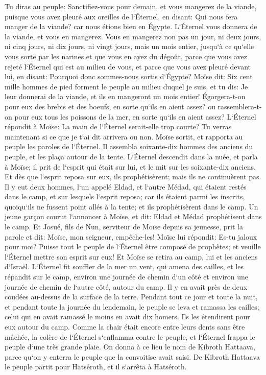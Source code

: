 \verse Tu diras au peuple: Sanctifiez-vous pour demain, et vous mangerez de la viande, puisque vous avez pleuré aux oreilles de l`Éternel, en disant: Qui nous fera manger de la viande? car nous étions bien en Égypte. L`Éternel vous donnera de la viande, et vous en mangerez. 
\verse Vous en mangerez non pas un jour, ni deux jours, ni cinq jours, ni dix jours, ni vingt jours, 
\verse mais un mois entier, jusqu`à ce qu`elle vous sorte par les narines et que vous en ayez du dégoût, parce que vous avez rejeté l`Éternel qui est au milieu de vous, et parce que vous avez pleuré devant lui, en disant: Pourquoi donc sommes-nous sortis d`Égypte? 
\verse Moïse dit: Six cent mille hommes de pied forment le peuple au milieu duquel je suis, et tu dis: Je leur donnerai de la viande, et ils en mangeront un mois entier! 
\verse Égorgera-t-on pour eux des brebis et des boeufs, en sorte qu`ils en aient assez? ou rassemblera-t-on pour eux tous les poissons de la mer, en sorte qu`ils en aient assez? 
\verse L`Éternel répondit à Moïse: La main de l`Éternel serait-elle trop courte? Tu verras maintenant si ce que je t`ai dit arrivera ou non. 
\verse Moïse sortit, et rapporta au peuple les paroles de l`Éternel. Il assembla soixante-dix hommes des anciens du peuple, et les plaça autour de la tente. 
\verse L`Éternel descendit dans la nuée, et parla à Moïse; il prit de l`esprit qui était sur lui, et le mit sur les soixante-dix anciens. Et dès que l`esprit reposa sur eux, ils prophétisèrent; mais ils ne continuèrent pas. 
\verse Il y eut deux hommes, l`un appelé Eldad, et l`autre Médad, qui étaient restés dans le camp, et sur lesquels l`esprit reposa; car ils étaient parmi les inscrits, quoiqu`ils ne fussent point allés à la tente; et ils prophétisèrent dans le camp. 
\verse Un jeune garçon courut l`annoncer à Moïse, et dit: Eldad et Médad prophétisent dans le camp. 
\verse Et Josué, fils de Nun, serviteur de Moïse depuis sa jeunesse, prit la parole et dit: Moïse, mon seigneur, empêche-les! 
\verse Moïse lui répondit: Es-tu jaloux pour moi? Puisse tout le peuple de l`Éternel être composé de prophètes; et veuille l`Éternel mettre son esprit sur eux! 
\verse Et Moïse se retira au camp, lui et les anciens d`Israël. 
\verse L`Éternel fit souffler de la mer un vent, qui amena des cailles, et les répandit sur le camp, environ une journée de chemin d`un côté et environ une journée de chemin de l`autre côté, autour du camp. Il y en avait près de deux coudées au-dessus de la surface de la terre. 
\verse Pendant tout ce jour et toute la nuit, et pendant toute la journée du lendemain, le peuple se leva et ramassa les cailles; celui qui en avait ramassé le moins en avait dix homers. Ils les étendirent pour eux autour du camp. 
\verse Comme la chair était encore entre leurs dents sans être mâchée, la colère de l`Éternel s`enflamma contre le peuple, et l`Éternel frappa le peuple d`une très grande plaie. 
\verse On donna à ce lieu le nom de Kibroth Hattaava, parce qu`on y enterra le peuple que la convoitise avait saisi. 
\verse De Kibroth Hattaava le peuple partit pour Hatséroth, et il s`arrêta à Hatséroth. 

